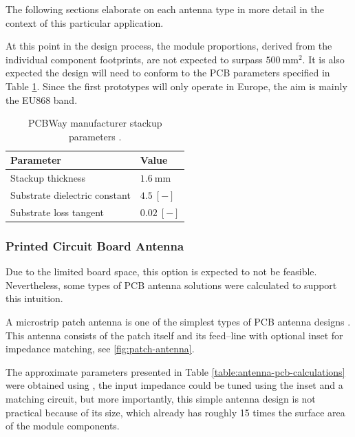 The following sections elaborate on each antenna type in more detail in the context of this particular application. 

At this point in the design process, the module proportions, derived from the individual component footprints, are not expected to surpass $500~\mathrm{mm^2}$. It is also expected the design will need to conform to the PCB parameters specified in Table \ref{table:pcb-parameters}. Since the first prototypes will only operate in Europe, the aim is mainly the EU868 band.

\begin{table}[H]
\begin{center}
\caption{\label{table:pcb-parameters}PCBWay manufacturer stackup parameters \cite{pcbway_stackup_2024}.}
    \begin{tabular}{|l|l|} \hline
    \textbf{Parameter}            & \textbf{Value} \\ \hline
    Stackup thickness             & $1.6~\mathrm{mm}$ \\ \hline
    Substrate dielectric constant & $4.5~\mathrm{[-]}$ \\ \hline
    Substrate loss tangent        & $0.02~\mathrm{[-]}$ \\ \hline
    \end{tabular}
\end{center}
\end{table}

\subsubsection{Printed Circuit Board Antenna}
Due to the limited board space, this option is expected to not be feasible. Nevertheless, some types of PCB antenna solutions were calculated to support this intuition.

A microstrip patch antenna is one of the simplest types of PCB antenna designs \cite{zachariah_peterson_microstrip_2022,wallace_an058_nodate}. This antenna consists of the patch itself and its feed--line with optional inset for impedance matching, see \ref{fig:patch-antenna}. 

The approximate parameters presented in Table \ref{table:antenna-pcb-calculations} were obtained using \cite{zachariah_peterson_microstrip_2022}, the input impedance could be tuned using the inset and a matching circuit, but more importantly, this simple antenna design is not practical because of its size, which already has roughly 15 times the surface area of the module components.

